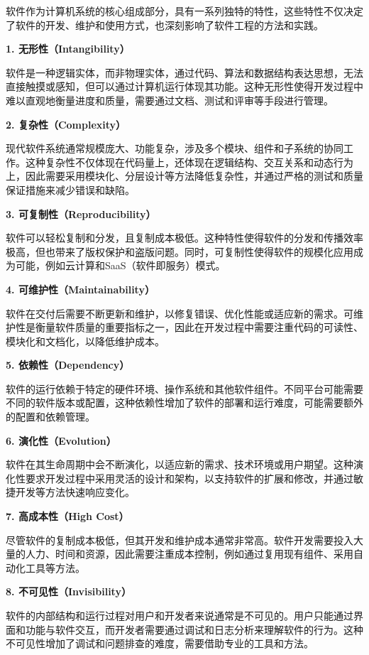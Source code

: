 软件作为计算机系统的核心组成部分，具有一系列独特的特性，这些特性不仅决定了软件的开发、维护和使用方式，也深刻影响了软件工程的方法和实践。

\textbf{1. 无形性（Intangibility）}

软件是一种逻辑实体，而非物理实体，通过代码、算法和数据结构表达思想，无法直接触摸或感知，但可以通过计算机运行体现其功能。这种无形性使得开发过程中难以直观地衡量进度和质量，需要通过文档、测试和评审等手段进行管理。

\textbf{2. 复杂性（Complexity）}

现代软件系统通常规模庞大、功能复杂，涉及多个模块、组件和子系统的协同工作。这种复杂性不仅体现在代码量上，还体现在逻辑结构、交互关系和动态行为上，因此需要采用模块化、分层设计等方法降低复杂性，并通过严格的测试和质量保证措施来减少错误和缺陷。

\textbf{3. 可复制性（Reproducibility）}

软件可以轻松复制和分发，且复制成本极低。这种特性使得软件的分发和传播效率极高，但也带来了版权保护和盗版问题。同时，可复制性使得软件的规模化应用成为可能，例如云计算和SaaS（软件即服务）模式。

\textbf{4. 可维护性（Maintainability）}

软件在交付后需要不断更新和维护，以修复错误、优化性能或适应新的需求。可维护性是衡量软件质量的重要指标之一，因此在开发过程中需要注重代码的可读性、模块化和文档化，以降低维护成本。

\textbf{5. 依赖性（Dependency）}

软件的运行依赖于特定的硬件环境、操作系统和其他软件组件。不同平台可能需要不同的软件版本或配置，这种依赖性增加了软件的部署和运行难度，可能需要额外的配置和依赖管理。

\textbf{6. 演化性（Evolution）}

软件在其生命周期中会不断演化，以适应新的需求、技术环境或用户期望。这种演化性要求开发过程中采用灵活的设计和架构，以支持软件的扩展和修改，并通过敏捷开发等方法快速响应变化。

\textbf{7. 高成本性（High Cost）}

尽管软件的复制成本极低，但其开发和维护成本通常非常高。软件开发需要投入大量的人力、时间和资源，因此需要注重成本控制，例如通过复用现有组件、采用自动化工具等方法。

\textbf{8. 不可见性（Invisibility）}

软件的内部结构和运行过程对用户和开发者来说通常是不可见的。用户只能通过界面和功能与软件交互，而开发者需要通过调试和日志分析来理解软件的行为。这种不可见性增加了调试和问题排查的难度，需要借助专业的工具和方法。

